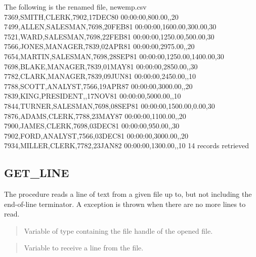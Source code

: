\documentclass[letterpaper,10pt,english,openany,oneside]{sphinxmanual}
\begin{document}
\begin{sphinxVerbatim}[commandchars=\\\{\}]
The following is the renamed file, \PYGZsq{}newemp.csv\PYGZsq{}
7369,SMITH,CLERK,7902,17\PYGZhy{}DEC\PYGZhy{}80 00:00:00,800.00,,20
7499,ALLEN,SALESMAN,7698,20\PYGZhy{}FEB\PYGZhy{}81 00:00:00,1600.00,300.00,30
7521,WARD,SALESMAN,7698,22\PYGZhy{}FEB\PYGZhy{}81 00:00:00,1250.00,500.00,30
7566,JONES,MANAGER,7839,02\PYGZhy{}APR\PYGZhy{}81 00:00:00,2975.00,,20
7654,MARTIN,SALESMAN,7698,28\PYGZhy{}SEP\PYGZhy{}81 00:00:00,1250.00,1400.00,30
7698,BLAKE,MANAGER,7839,01\PYGZhy{}MAY\PYGZhy{}81 00:00:00,2850.00,,30
7782,CLARK,MANAGER,7839,09\PYGZhy{}JUN\PYGZhy{}81 00:00:00,2450.00,,10
7788,SCOTT,ANALYST,7566,19\PYGZhy{}APR\PYGZhy{}87 00:00:00,3000.00,,20
7839,KING,PRESIDENT,,17\PYGZhy{}NOV\PYGZhy{}81 00:00:00,5000.00,,10
7844,TURNER,SALESMAN,7698,08\PYGZhy{}SEP\PYGZhy{}81 00:00:00,1500.00,0.00,30
7876,ADAMS,CLERK,7788,23\PYGZhy{}MAY\PYGZhy{}87 00:00:00,1100.00,,20
7900,JAMES,CLERK,7698,03\PYGZhy{}DEC\PYGZhy{}81 00:00:00,950.00,,30
7902,FORD,ANALYST,7566,03\PYGZhy{}DEC\PYGZhy{}81 00:00:00,3000.00,,20
7934,MILLER,CLERK,7782,23\PYGZhy{}JAN\PYGZhy{}82 00:00:00,1300.00,,10
14 records retrieved
\end{sphinxVerbatim}

\newpage


\subsection{GET\_LINE}
\label{\detokenize{utl_file:get-line}}
The  procedure reads a line of text from a given file up to,
but not including the end-of-line terminator. A 
exception is thrown when there are no more lines to read.
\begin{quote}

\end{quote}


\begin{quote}

Variable of type  containing the file handle of the opened
file.
\end{quote}

\begin{quote}

Variable to receive a line from the file.
\end{quote}
\end{document}

